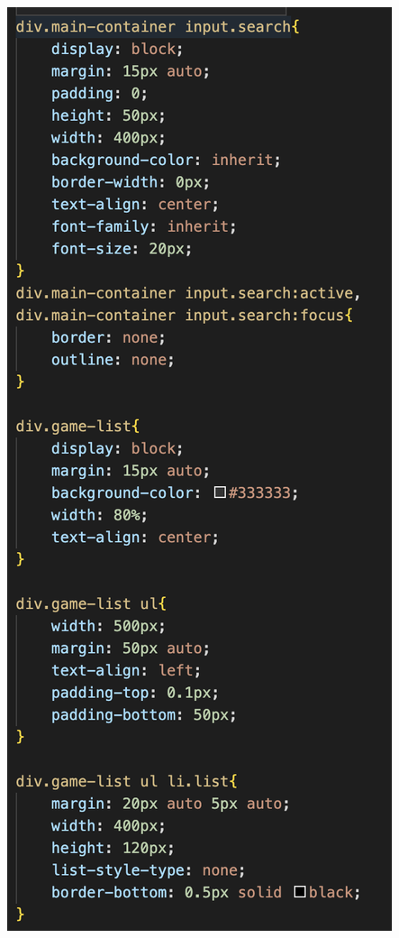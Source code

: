 \documentclass[12pt, letterpaper]{article}
\begin{document}
\begin{center}
	\includegraphics[scale=0.6]{style3}
\end{center}
\end{document}
